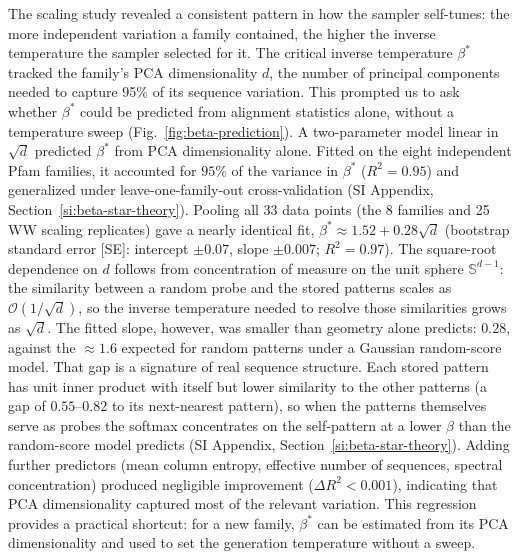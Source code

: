 The scaling study revealed a consistent pattern in how the sampler self-tunes: the more independent variation a family contained, the higher the inverse temperature the sampler selected for it. The critical inverse temperature $\beta^*$ tracked the family's PCA dimensionality $d$, the number of principal components needed to capture 95\% of its sequence variation. This prompted us to ask whether $\beta^*$ could be predicted from alignment statistics alone, without a temperature sweep (Fig.~\ref{fig:beta-prediction}). A two-parameter model linear in $\sqrt{d}$ predicted $\beta^*$ from PCA dimensionality alone. Fitted on the eight independent Pfam families, it accounted for $95\%$ of the variance in $\beta^*$ ($R^2{=}0.95$) and generalized under leave-one-family-out cross-validation (SI Appendix, Section~\ref{si:beta-star-theory}). Pooling all 33 data points (the 8 families and 25 WW scaling replicates) gave a nearly identical fit, $\beta^* \approx 1.52 + 0.28\sqrt{d}$ (bootstrap standard error [SE]: intercept $\pm 0.07$, slope $\pm 0.007$; $R^2{=}0.97$). The square-root dependence on $d$ follows from concentration of measure on the unit sphere $\mathbb{S}^{d-1}$: the similarity between a random probe and the stored patterns scales as $\mathcal{O}(1/\sqrt{d})$, so the inverse temperature needed to resolve those similarities grows as $\sqrt{d}$. The fitted slope, however, was smaller than geometry alone predicts: $0.28$, against the ${\approx}1.6$ expected for random patterns under a Gaussian random-score model. That gap is a signature of real sequence structure. Each stored pattern has unit inner product with itself but lower similarity to the other patterns (a gap of $0.55$--$0.82$ to its next-nearest pattern), so when the patterns themselves serve as probes the softmax concentrates on the self-pattern at a lower $\beta$ than the random-score model predicts (SI Appendix, Section~\ref{si:beta-star-theory}). Adding further predictors (mean column entropy, effective number of sequences, spectral concentration) produced negligible improvement ($\Delta R^2 < 0.001$), indicating that PCA dimensionality captured most of the relevant variation. This regression provides a practical shortcut: for a new family, $\beta^*$ can be estimated from its PCA dimensionality and used to set the generation temperature without a sweep.

